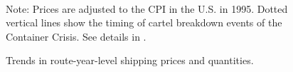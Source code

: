 \documentclass[10pt]{article}
\begin{document}
\begin{figure}[!ht]
\begin{center}
  \\
  \caption{Trends in route-year-level shipping prices and quantities.}
  \label{fg:container_freight_rate_and_shipping_quantity_each_route}
  \end{center}
\footnotesize
  Note: Prices are adjusted to the CPI in the U.S. in 1995. Dotted vertical lines show the timing of cartel breakdown events of the Container Crisis. See details in \cite{matsuda2022unified}.
\end{figure}
\end{document}
